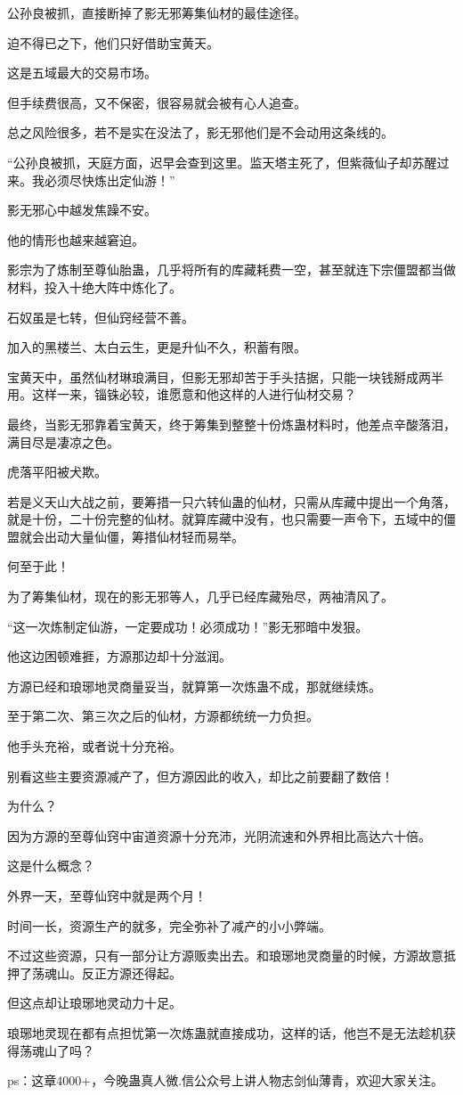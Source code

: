 \begin{this_body}
公孙良被抓，直接断掉了影无邪筹集仙材的最佳途径。

迫不得已之下，他们只好借助宝黄天。

这是五域最大的交易市场。

但手续费很高，又不保密，很容易就会被有心人追查。

总之风险很多，若不是实在没法了，影无邪他们是不会动用这条线的。

“公孙良被抓，天庭方面，迟早会查到这里。监天塔主死了，但紫薇仙子却苏醒过来。我必须尽快炼出定仙游！”

影无邪心中越发焦躁不安。

他的情形也越来越窘迫。

影宗为了炼制至尊仙胎蛊，几乎将所有的库藏耗费一空，甚至就连下宗僵盟都当做材料，投入十绝大阵中炼化了。

石奴虽是七转，但仙窍经营不善。

加入的黑楼兰、太白云生，更是升仙不久，积蓄有限。

宝黄天中，虽然仙材琳琅满目，但影无邪却苦于手头拮据，只能一块钱掰成两半用。这样一来，锱铢必较，谁愿意和他这样的人进行仙材交易？

最终，当影无邪靠着宝黄天，终于筹集到整整十份炼蛊材料时，他差点辛酸落泪，满目尽是凄凉之色。

虎落平阳被犬欺。

若是义天山大战之前，要筹措一只六转仙蛊的仙材，只需从库藏中提出一个角落，就是十份，二十份完整的仙材。就算库藏中没有，也只需要一声令下，五域中的僵盟就会出动大量仙僵，筹措仙材轻而易举。

何至于此！

为了筹集仙材，现在的影无邪等人，几乎已经库藏殆尽，两袖清风了。

“这一次炼制定仙游，一定要成功！必须成功！”影无邪暗中发狠。

他这边困顿难捱，方源那边却十分滋润。

方源已经和琅琊地灵商量妥当，就算第一次炼蛊不成，那就继续炼。

至于第二次、第三次之后的仙材，方源都统统一力负担。

他手头充裕，或者说十分充裕。

别看这些主要资源减产了，但方源因此的收入，却比之前要翻了数倍！

为什么？

因为方源的至尊仙窍中宙道资源十分充沛，光阴流速和外界相比高达六十倍。

这是什么概念？

外界一天，至尊仙窍中就是两个月！

时间一长，资源生产的就多，完全弥补了减产的小小弊端。

不过这些资源，只有一部分让方源贩卖出去。和琅琊地灵商量的时候，方源故意抵押了荡魂山。反正方源还得起。

但这点却让琅琊地灵动力十足。

琅琊地灵现在都有点担忧第一次炼蛊就直接成功，这样的话，他岂不是无法趁机获得荡魂山了吗？

ps：这章4000+，今晚蛊真人微.信公众号上讲人物志剑仙薄青，欢迎大家关注。

\end{this_body}

